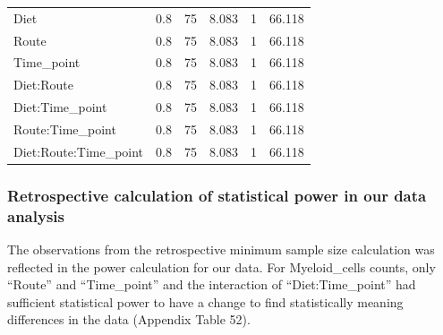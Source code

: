 \documentclass[
  12pt,
  letterpaper,
]{article}
\begin{document}
\begin{longtable}{l|rrrrr}
\midrule\addlinespace[2.5pt]
\multicolumn{6}{l}{Diet:Route:Time\_point} \\[2.5pt] 
\midrule\addlinespace[2.5pt]
Diet & 0.8 & 75 & 8.083 & 1 & 66.118 \\ 
Route & 0.8 & 75 & 8.083 & 1 & 66.118 \\ 
Time\_point & 0.8 & 75 & 8.083 & 1 & 66.118 \\ 
Diet:Route & 0.8 & 75 & 8.083 & 1 & 66.118 \\ 
Diet:Time\_point & 0.8 & 75 & 8.083 & 1 & 66.118 \\ 
Route:Time\_point & 0.8 & 75 & 8.083 & 1 & 66.118 \\ 
Diet:Route:Time\_point & 0.8 & 75 & 8.083 & 1 & 66.118 \\ 
\bottomrule
\end{longtable}
\endgroup

\subsubsection{Retrospective calculation of statistical power in our data analysis}\label{retrospective-calculation-of-statistical-power-in-our-data-analysis-1}

The observations from the retrospective minimum sample size calculation was reflected in the power calculation for our data. For Myeloid\_cells counts, only ``Route'' and ``Time\_point'' and the interaction of ``Diet:Time\_point'' had sufficient statistical power to have a change to find statistically meaning differences in the data (Appendix Table 52).
\end{document}
